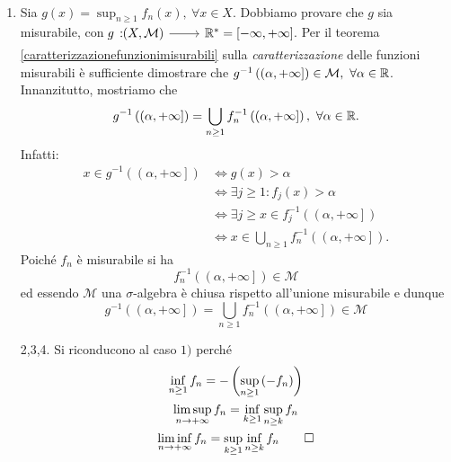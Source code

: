 \begin{demonstration}~{}
	\begin{enumerate}
		\item Sia $\displaystyle g(x)=\sup_{n\geq 1} f_n(x),\ \forall x\in X$. Dobbiamo provare che $g$ sia misurabile, con $\funz{g}{\left(X,\mathcal{M}\right)}{\realset^{\ast}=\left[-\infty,+\infty\right]}$. Per il teorema \ref{caratterizzazionefunzionimisurabili} sulla \textit{caratterizzazione} delle funzioni misurabili è sufficiente dimostrare che $g^{-1}\left(\left(\alpha,+\infty\right]\right)\in\mathcal{M},\ \forall\alpha\in\realset$.\\
		Innanzitutto, mostriamo che
		\begin{equation*}
			g^{-1}\left(\left(\alpha,+\infty\right]\right)=\bigcup_{n\geq 1}f_n^{-1}\left(\left(\alpha,+\infty\right]\right),\ \forall \alpha\in\mathbb{R}.
		\end{equation*}
	Infatti:
	\begin{align*}
		x\in g^{-1}\left(\left(\alpha,+\infty\right]\right)&\iff g(x)>\alpha\\
		& \iff \exists j\geq 1\colon f_j(x)>\alpha\\
		& \iff \exists j\geq x\in f_j^{-1}\left(\left(\alpha,+\infty\right]\right)\\
		& \iff x\in \bigcup_{n\geq 1}f_n^{-1}\left(\left(\alpha,+\infty\right]\right).
	\end{align*}
	Poiché $f_n$ è misurabile si ha
	\begin{equation*}
		f_n^{-1}\left(\left(\alpha,+\infty\right]\right)\in\mathcal{M}
	\end{equation*}
ed essendo $\mathcal{M}$ una $\sigma$-algebra è chiusa rispetto all'unione misurabile e dunque
	\begin{equation*}
	g^{-1}\left(\left(\alpha,+\infty\right]\right)=\bigcup_{n\geq 1}f_n^{-1}\left(\left(\alpha,+\infty\right]\right)\in\mathcal{M}
	\end{equation*}
	\item[2,3,4.] Si riconducono al caso $1)$ perché
	\begin{gather*}
		\inf_{n\geq 1}f_n=-\left(\sup_{n\geq 1}\left(-f_n\right)\right)\\
		\limsup_{n\to+\infty}f_n=\inf_{k\geq 1}\sup_{n\geq k}f_n\\
		\liminf_{n\to+\infty}f_n=\sup_{k\geq 1}\inf_{n\geq k}f_n\qedhere
	\end{gather*}
	\end{enumerate}
\end{demonstration}
